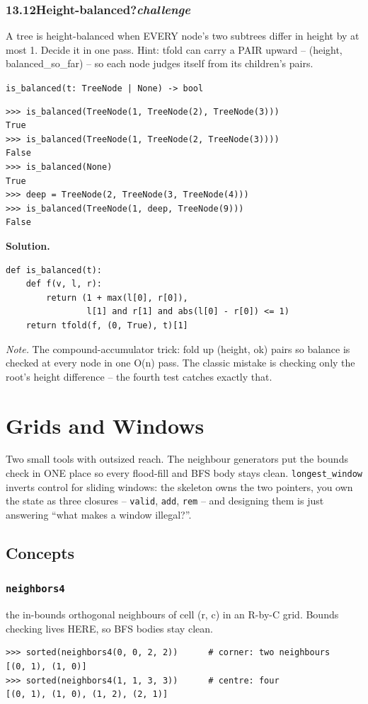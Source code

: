 \documentclass[10pt,letterpaper]{book}
\begin{document}
\subsection*{13.12\quad Height-balanced?\hfill\textnormal{\textit{challenge}}}
A tree is height-balanced when EVERY node's two subtrees differ in height by at most 1. Decide it in one pass. Hint: tfold can carry a PAIR upward -- (height, balanced\_so\_far) -- so each node judges itself from its children's pairs.

\noindent\texttt{is\_balanced(t: TreeNode | None) -> bool}
\begin{lstlisting}[style=ex]
>>> is_balanced(TreeNode(1, TreeNode(2), TreeNode(3)))
True
>>> is_balanced(TreeNode(1, TreeNode(2, TreeNode(3))))
False
>>> is_balanced(None)
True
>>> deep = TreeNode(2, TreeNode(3, TreeNode(4)))
>>> is_balanced(TreeNode(1, deep, TreeNode(9)))
False
\end{lstlisting}
\noindent\textbf{Solution.}
\begin{lstlisting}[style=code]
def is_balanced(t):
    def f(v, l, r):
        return (1 + max(l[0], r[0]),
                l[1] and r[1] and abs(l[0] - r[0]) <= 1)
    return tfold(f, (0, True), t)[1]
\end{lstlisting}
\noindent\textit{Note.} The compound-accumulator trick: fold up (height, ok) pairs so balance is checked at every node in one O(n) pass. The classic mistake is checking only the root's height difference -- the fourth test catches exactly that.

\clearpage
\chapter{Grids and Windows}

Two small tools with outsized reach. The neighbour generators put the
bounds check in ONE place so every flood-fill and BFS body stays clean.
\texttt{longest\_window} inverts control for sliding windows: the skeleton
owns the two pointers, you own the state as three closures --
\texttt{valid}, \texttt{add}, \texttt{rem} -- and designing them is just
answering ``what makes a window illegal?''.
\section{Concepts}
\subsection{\texttt{neighbors4}}\label{def:neighbors4}
the in-bounds orthogonal neighbours of cell (r, c) in an R-by-C grid. Bounds checking lives HERE, so BFS bodies stay clean.
\begin{lstlisting}[style=ex]
>>> sorted(neighbors4(0, 0, 2, 2))      # corner: two neighbours
[(0, 1), (1, 0)]
>>> sorted(neighbors4(1, 1, 3, 3))      # centre: four
[(0, 1), (1, 0), (1, 2), (2, 1)]
\end{lstlisting}
\end{document}
